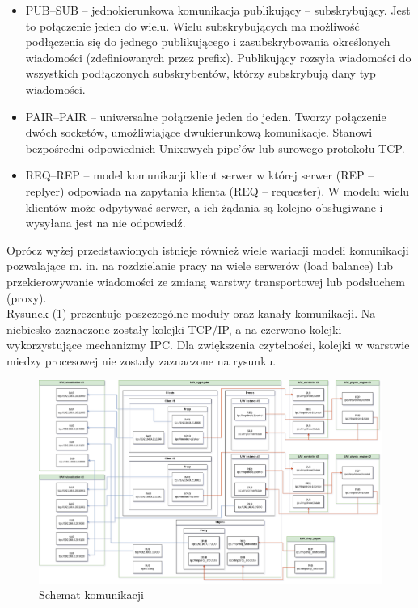 \documentclass[15pt]{sprawozdanie}
\begin{document}
\begin{itemize}
\item PUB--SUB -- jednokierunkowa komunikacja publikujący --  subskrybujący. Jest to połączenie jeden do wielu.  Wielu subskrybujących ma możliwość podłączenia się do jednego publikującego i zasubskrybowania określonych wiadomości (zdefiniowanych przez prefix). Publikujący rozsyła wiadomości do wszystkich podłączonych subskrybentów, którzy subskrybują dany typ wiadomości.

\item PAIR--PAIR -- uniwersalne połączenie jeden do jeden. Tworzy połączenie dwóch socketów, umożliwiające dwukierunkową komunikacje. Stanowi bezpośredni odpowiednich Unixowych pipe'ów lub surowego protokołu TCP.

\item REQ--REP -- model komunikacji klient serwer w której serwer (REP -- replyer) odpowiada na zapytania klienta (REQ -- requester). W modelu wielu klientów może odpytywać serwer, a ich żądania są kolejno obsługiwane i wysyłana jest na nie odpowiedź.
\end{itemize}

Oprócz wyżej przedstawionych istnieje również wiele wariacji modeli komunikacji pozwalające m. in. na rozdzielanie pracy na wiele serwerów (load balance) lub przekierowywanie wiadomości ze zmianą warstwy transportowej lub podsłuchem (proxy).\\

Rysunek (\ref{comm}) prezentuje poszczególne moduły oraz kanały komunikacji. Na niebiesko zaznaczone zostały kolejki TCP/IP, a na czerwono kolejki wykorzystujące mechanizmy IPC. Dla zwiększenia czytelności, kolejki w warstwie miedzy procesowej nie zostały zaznaczone na rysunku.

\newpage
 \begin{figure}[!h]
  \centering
  \includegraphics[width=1.2\textwidth, angle=90]{ZMQinMINIUAV.drawio.png}
  \caption{Schemat komunikacji}
  \label{comm}
 \end{figure}
\end{document}
